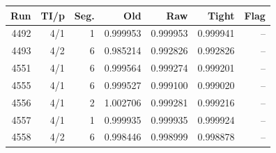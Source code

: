 \begin{tabular}{rrrrrrr}\toprule Run & TI/p & Seg. & Old & Raw & Tight & Flag\\\midrule
4492 & 4/1 & 1 & 0.999953 & 0.999953 & 0.999941 & --\\
4493 & 4/2 & 6 & 0.985214 & 0.992826 & 0.992826 & --\\
4551 & 4/1 & 6 & 0.999564 & 0.999274 & 0.999201 & --\\
4555 & 4/1 & 6 & 0.999527 & 0.999100 & 0.999020 & --\\
4556 & 4/1 & 2 & 1.002706 & 0.999281 & 0.999216 & --\\
4557 & 4/1 & 1 & 0.999935 & 0.999935 & 0.999924 & --\\
4558 & 4/2 & 6 & 0.998446 & 0.998999 & 0.998878 & --\\
\bottomrule\end{tabular}